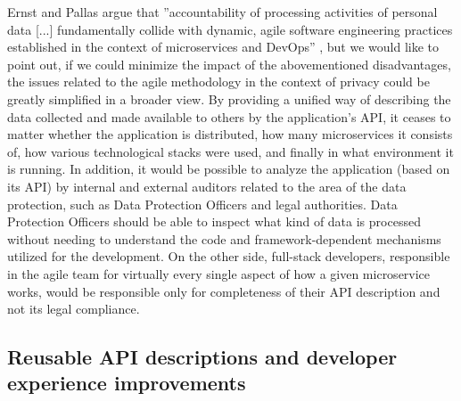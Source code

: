 Ernst and Pallas argue that ''accountability of processing activities of personal data [...] fundamentally collide with dynamic, agile software engineering practices established in the context of microservices and DevOps'' \cite{ErnstTransparencyComputing}, but we would like to point out, if we could minimize the impact of the abovementioned disadvantages, the issues related to the agile methodology in the context of privacy could be greatly simplified in a broader view. By providing a unified way of describing the data collected and made available to others by the application's API, it ceases to matter whether the application is distributed, how many microservices it consists of, how various technological stacks were used, and finally in what environment it is running. In addition, it would be possible to analyze the application (based on its API) by internal and external auditors related to the area of the data protection, such as Data Protection Officers and legal authorities. Data Protection Officers should be able to inspect what kind of data is processed without needing to understand the code and framework-dependent mechanisms utilized for the development. On the other side, full-stack developers, responsible in the agile team for virtually every single aspect of how a given microservice works, would be responsible only for completeness of their API description and not its legal compliance. 

\subsection{Reusable API descriptions and developer experience improvements}

